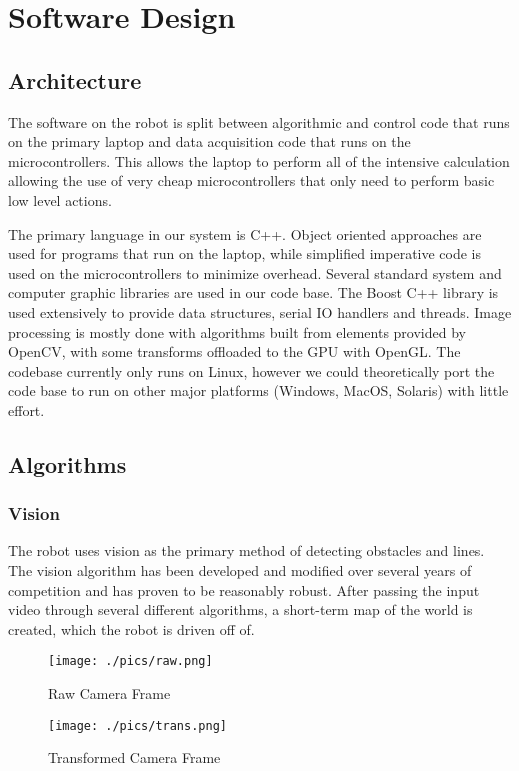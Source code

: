 \section{Software Design}

\subsection{Architecture}

The software on the robot is split between algorithmic and control code that runs on the primary laptop and data acquisition code that runs on the microcontrollers. This allows the laptop to perform all of the intensive calculation allowing the use of very cheap microcontrollers that only need to perform basic low level actions.

The primary language in our system is C++. Object oriented approaches are used for programs that run on the laptop, while simplified imperative code is used on the microcontrollers to minimize overhead. Several standard system and computer graphic libraries are used in our code base. The Boost C++ library is used extensively to provide data structures, serial IO handlers and threads. Image processing is mostly done with algorithms built from elements provided by OpenCV, with some transforms offloaded to the GPU with OpenGL. The codebase currently only runs on Linux, however we could theoretically port the code base to run on other major platforms (Windows, MacOS, Solaris) with little effort.

\subsection{Algorithms}

\subsubsection{Vision}

The robot uses vision as the primary method of detecting obstacles and lines. The vision algorithm has been developed and modified over several years of competition and has proven to be reasonably robust. After passing the input video through several different algorithms, a short-term map of the world is created, which the robot is driven off of.

\begin{figure}[H]
\begin{minipage}[b]{0.5\linewidth}
\centering
\texttt{[image: ./pics/raw.png]}
\caption{Raw Camera Frame}
\label{FIG:Raw}
\end{minipage}
\hspace{0.1in}
\begin{minipage}[b]{0.5\linewidth}
\centering
\texttt{[image: ./pics/trans.png]}
\caption{Transformed Camera Frame}
\label{FIG:Trans}
\end{minipage}
\end{figure}

